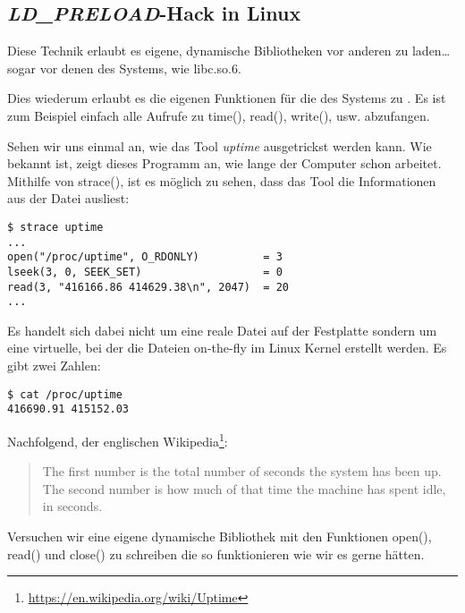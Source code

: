 \subsection{\emph{LD\_PRELOAD}-Hack in Linux}

\label{ld_preload}

Diese Technik erlaubt es eigene, dynamische Bibliotheken vor anderen zu laden\dots{}
sogar vor denen des Systems, wie libc.so.6.

Dies wiederum erlaubt es die eigenen Funktionen für die des Systems zu .
Es ist zum Beispiel einfach alle Aufrufe zu time(), read(), write(), usw. abzufangen.

Sehen wir uns einmal an, wie das Tool \emph{uptime} ausgetrickst werden kann.
Wie bekannt ist, zeigt dieses Programm an, wie lange der Computer schon arbeitet.
Mithilfe von strace(), ist es möglich zu sehen, dass das Tool die
Informationen aus der Datei  ausliest:

\begin{lstlisting}
$ strace uptime 
...
open("/proc/uptime", O_RDONLY)          = 3
lseek(3, 0, SEEK_SET)                   = 0
read(3, "416166.86 414629.38\n", 2047)  = 20
...
\end{lstlisting}

Es handelt sich dabei nicht um eine reale Datei auf der Festplatte sondern um eine
virtuelle, bei der die Dateien on-the-fly im Linux Kernel erstellt werden.
Es gibt zwei Zahlen:

\begin{lstlisting}
$ cat /proc/uptime
416690.91 415152.03
\end{lstlisting}

Nachfolgend, der englischen Wikipedia\footnote{\url{https://en.wikipedia.org/wiki/Uptime}}:

\begin{framed}
\begin{quotation}
The first number is the total number of seconds the system has been up.
The second number is how much of that time the machine has spent idle, in seconds.
\end{quotation}
\end{framed}


Versuchen wir eine eigene dynamische Bibliothek mit den Funktionen open(), read()
und close() zu schreiben die so funktionieren wie wir es gerne hätten.

